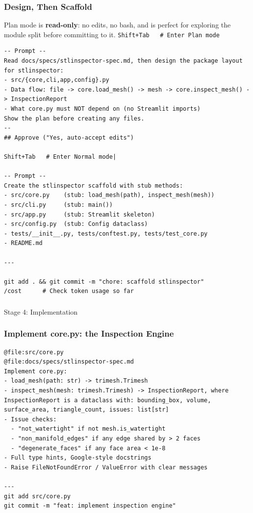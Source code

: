\begin{frame}[fragile]\frametitle{Design, Then Scaffold}
Plan mode is \textbf{read-only}: no edits, no bash, and is perfect for exploring the module split before committing to it.
\lstinline|Shift+Tab   # Enter Plan mode|

\begin{lstlisting}
-- Prompt --
Read docs/specs/stlinspector-spec.md, then design the package layout for stlinspector:
- src/{core,cli,app,config}.py
- Data flow: file -> core.load_mesh() -> mesh -> core.inspect_mesh() -> InspectionReport
- What core.py must NOT depend on (no Streamlit imports)
Show the plan before creating any files.
--
## Approve ("Yes, auto-accept edits")

Shift+Tab   # Enter Normal mode|

-- Prompt --
Create the stlinspector scaffold with stub methods:
- src/core.py    (stub: load_mesh(path), inspect_mesh(mesh))
- src/cli.py     (stub: main())
- src/app.py     (stub: Streamlit skeleton)
- src/config.py  (stub: Config dataclass)
- tests/__init__.py, tests/conftest.py, tests/test_core.py
- README.md

---

git add . && git commit -m "chore: scaffold stlinspector"
/cost      # Check token usage so far
\end{lstlisting}
\end{frame}


\begin{frame}[fragile]\frametitle{}
\begin{center}
{\Large Stage 4: Implementation}
\end{center}
\end{frame}


\begin{frame}[fragile]\frametitle{Implement core.py: the Inspection Engine}
\begin{lstlisting}
@file:src/core.py
@file:docs/specs/stlinspector-spec.md
Implement core.py:
- load_mesh(path: str) -> trimesh.Trimesh
- inspect_mesh(mesh: trimesh.Trimesh) -> InspectionReport, where InspectionReport is a dataclass with: bounding_box, volume, surface_area, triangle_count, issues: list[str]
- Issue checks:
  - "not_watertight" if not mesh.is_watertight
  - "non_manifold_edges" if any edge shared by > 2 faces
  - "degenerate_faces" if any face area < 1e-8
- Full type hints, Google-style docstrings
- Raise FileNotFoundError / ValueError with clear messages

---
git add src/core.py
git commit -m "feat: implement inspection engine"
\end{lstlisting}
\end{frame}


